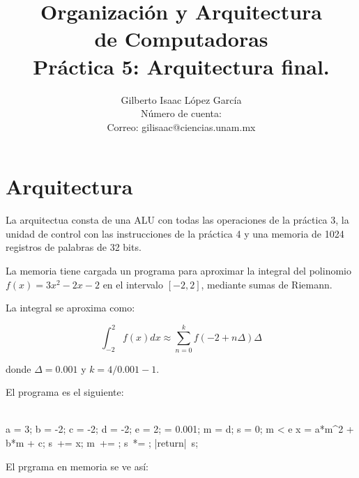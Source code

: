 \documentclass[12pt]{article}
\title{Organización y Arquitectura\\
  de Computadoras\\
  Práctica 5: Arquitectura final.}
\author{Gilberto Isaac López García\\
  Número de cuenta:\\
  Correo: gilisaac@ciencias.unam.mx}
\date{}
\begin{document}
\maketitle


\section*{Arquitectura}

La arquitectua consta de una ALU con todas las operaciones de la práctica 3, la unidad de control con las instrucciones de la práctica 4 y una memoria de 1024 registros de palabras de 32 bits.

La memoria tiene cargada un programa para aproximar la integral del polinomio $f(x) = 3x^2-2x-2$ en el intervalo $[-2,2]$, mediante sumas de Riemann.

La integral se aproxima como:

$$\int_{-2}^{2} f(x) dx \approx \sum_{n = 0}^{k} f(-2+n\Delta)\Delta$$

donde $\Delta = 0.001$ y $k = 4/0.001 -1$.

El programa es el siguiente:

\begin{program}
  \BEGIN \\ %
    a = 3;
    b = -2;
    c = -2; %
    d = -2;
    e = 2; %
    \Delta = 0.001; %
    m = d;
    s = 0;
    \WHILE m < e \DO
    x = a*m^2 + b*m + c;
    s\ += x;
    m\ += \Delta;
  \END
  s\ *= \Delta;
  |return|\ s;
\END
\end{program}

El prgrama en memoria se ve así:
\end{document}
